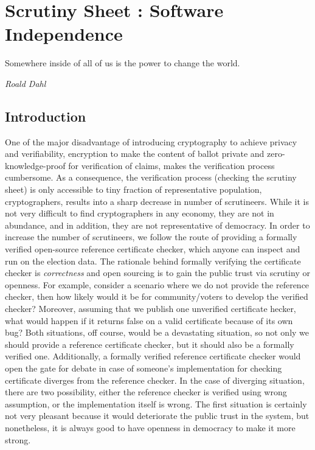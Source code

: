\chapter{Scrutiny Sheet : Software Independence}
\label{cha:software_independence}

\epigraph{Somewhere inside of all of us is the power to change the world.} 
{\textit{Roald Dahl }}

\section{Introduction}


One of the major disadvantage of introducing cryptography 
to achieve privacy and verifiability, encryption to make the 
content of ballot private and zero-knowledge-proof for verification of claims, makes the verification 
process cumbersome. As a consequence, the verification process (checking the scrutiny sheet) is only accessible 
to tiny fraction of representative population, cryptographers, results into a sharp decrease in number of scrutineers. 
While it is not very difficult to find cryptographers in any economy, 
they are not in abundance, and in addition, they are not representative of democracy. 
In order to increase the number of scrutineers, we follow the route of providing a formally verified open-source 
reference certificate checker, which anyone can inspect and run on the election data. 
  The rationale behind formally verifying the certificate checker is \emph{correctness}
  and open sourcing is to gain the public trust  via scrutiny or openness.  
  For example, consider a scenario where we do not provide the reference checker,
  then how 
  likely would it be for community/voters to develop the 
  verified checker? Moreover, assuming that we publish one unverified certificate hecker,
  what would happen if it returns false on a valid certificate because of its own bug? 
  Both situations, off course, would be a devastating situation, so not only we 
  should provide a reference certificate checker, but it should also be a formally verified one. 
  Additionally, a formally verified reference certificate checker would open the gate for
  debate in case of someone's implementation for checking certificate diverges from the reference checker.  
In the case of diverging situation, there are two possibility, either the reference checker is verified 
using wrong assumption,  or the implementation itself is wrong.  The first situation is certainly 
not very pleasant because it would deteriorate the public trust in the system, but nonetheless, it is always
good to  have openness in democracy to make it more strong. 
  
